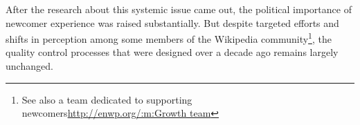 After the research about this systemic issue came out, the political importance of newcomer experience was raised substantially.  But despite targeted efforts and shifts in perception among some members of the Wikipedia community\cite{narayan2015effects, morgan2013tea}\footnote{See also a team dedicated to supporting newcomers\url{http://enwp.org/:m:Growth team}}, the quality control processes that were designed over a decade ago remains largely unchanged\cite{halfaker2014snuggle}.

